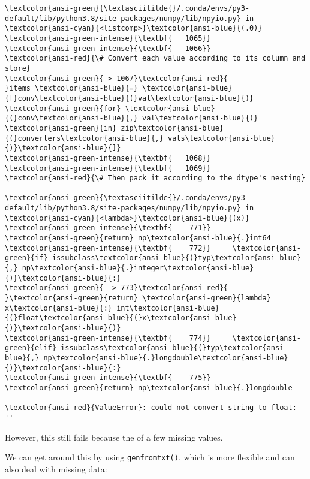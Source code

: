 \documentclass[10pt]{scrartcl}
\begin{document}
\begin{Verbatim}[commandchars=\\\{\}, frame=single, framerule=2mm, rulecolor=\color{outerrorbackground}]
\textcolor{ansi-green}{\textasciitilde{}/.conda/envs/py3-default/lib/python3.8/site-packages/numpy/lib/npyio.py} in \textcolor{ansi-cyan}{<listcomp>}\textcolor{ansi-blue}{(.0)}
\textcolor{ansi-green-intense}{\textbf{   1065}} 
\textcolor{ansi-green-intense}{\textbf{   1066}}             \textcolor{ansi-red}{\# Convert each value according to its column and store}
\textcolor{ansi-green}{-> 1067}\textcolor{ansi-red}{             }items \textcolor{ansi-blue}{=} \textcolor{ansi-blue}{[}conv\textcolor{ansi-blue}{(}val\textcolor{ansi-blue}{)} \textcolor{ansi-green}{for} \textcolor{ansi-blue}{(}conv\textcolor{ansi-blue}{,} val\textcolor{ansi-blue}{)} \textcolor{ansi-green}{in} zip\textcolor{ansi-blue}{(}converters\textcolor{ansi-blue}{,} vals\textcolor{ansi-blue}{)}\textcolor{ansi-blue}{]}
\textcolor{ansi-green-intense}{\textbf{   1068}} 
\textcolor{ansi-green-intense}{\textbf{   1069}}             \textcolor{ansi-red}{\# Then pack it according to the dtype's nesting}

\textcolor{ansi-green}{\textasciitilde{}/.conda/envs/py3-default/lib/python3.8/site-packages/numpy/lib/npyio.py} in \textcolor{ansi-cyan}{<lambda>}\textcolor{ansi-blue}{(x)}
\textcolor{ansi-green-intense}{\textbf{    771}}         \textcolor{ansi-green}{return} np\textcolor{ansi-blue}{.}int64
\textcolor{ansi-green-intense}{\textbf{    772}}     \textcolor{ansi-green}{if} issubclass\textcolor{ansi-blue}{(}typ\textcolor{ansi-blue}{,} np\textcolor{ansi-blue}{.}integer\textcolor{ansi-blue}{)}\textcolor{ansi-blue}{:}
\textcolor{ansi-green}{--> 773}\textcolor{ansi-red}{         }\textcolor{ansi-green}{return} \textcolor{ansi-green}{lambda} x\textcolor{ansi-blue}{:} int\textcolor{ansi-blue}{(}float\textcolor{ansi-blue}{(}x\textcolor{ansi-blue}{)}\textcolor{ansi-blue}{)}
\textcolor{ansi-green-intense}{\textbf{    774}}     \textcolor{ansi-green}{elif} issubclass\textcolor{ansi-blue}{(}typ\textcolor{ansi-blue}{,} np\textcolor{ansi-blue}{.}longdouble\textcolor{ansi-blue}{)}\textcolor{ansi-blue}{:}
\textcolor{ansi-green-intense}{\textbf{    775}}         \textcolor{ansi-green}{return} np\textcolor{ansi-blue}{.}longdouble

\textcolor{ansi-red}{ValueError}: could not convert string to float: ''
    \end{Verbatim}

    However, this still fails because the of a few missing values.

We can get around this by using \texttt{genfromtxt()}, which is more
flexible and can also deal with missing data:
\end{document}
